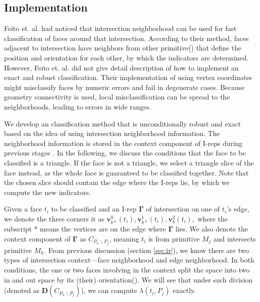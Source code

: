 \iffalse

\subsection{Implementation}

\label{sec:individual}

Feito et. al. \cite{feito2013fast} had noticed that intersection neighborhood can be used for fast classification of faces around that intersection. According to their method, faces adjacent to intersection have neighbors from other primitive() that define the position and orientation for each other, by which the indicators are determined. However, Feito et. al. did not give detail description of how to implement an exact and robust classification. Their implementation of using vertex coordinates might misclassify faces by numeric errors and fail in degenerate cases. Because geometry connectivity is used, local misclassification can be spread to the neighborhoods, leading to errors in wide ranges.

We develop an classification method that is unconditionally robust and exact based on the idea of using intersection neighborhood information. The neighborhood information is stored in the context component of I-reps during previous stages . In the following, we discuss the conditions that the face to be classified is a triangle. If the face is not a triangle, we select a triangle slice of the face instead, as the whole face is guaranteed to be classified together. Note that the chosen slice should contain the edge where the I-reps lie, by which we compute the new indicators.

Given a face $t_i$ to be classified and an I-rep $\boldsymbol\Gamma$ of intersection on one of $t_i$'s edge, we denote the three corners it as $\bm{v}_{b*}^{0}(t_i), \bm{v}_{b*}^{1}(t_i), \bm{v}_b^2(t_i),$ where the subscript $*$ means the vertices are on the edge where $\boldsymbol\Gamma$ lies. We also denote the context component of $\boldsymbol\Gamma$ as $C_{P_h \backslash P_j}$, meaning $t_i$ is from primitive $M_j$ and intersects primitive $M_h$. From previous discussion (section \ref{sec:ir}){\color{red}{may be more than one}}, we know there are two types of intersection context---face neighborhood and edge neighborhood. In both conditions, the one or two faces involving in the context split the space into two in and out space by its (their) orientation(). We will see that under such division (denoted as $\boldsymbol{D}(C_{P_h \backslash P_j})$), we can compute $\lambda(t_i, P_j)$ exactly.

